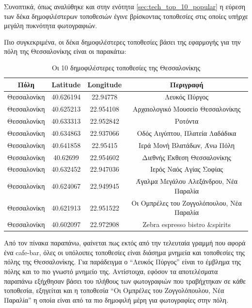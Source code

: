 \documentclass[oneside, 12pt]{book}
\begin{document}
Συνοπτικά, όπως αναλύθηκε και στην ενότητα \ref{sec:tech_top_10_popular} η εύρεση των δέκα δημοφιλέστερων τοποθεσιών έγινε βρίσκοντας τοποθεσίες στις οποίες υπήρχε μεγάλη πυκνότητα φωτογραφιών.

Πιο συγκεκριμένα, οι δέκα δημοφιλέστερες τοποθεσίες βάσει της εφαρμογής για την πόλη της Θεσσαλονίκης είναι οι παρακάτω:
\begin{table}[H]
\centering
    \begin{tabular}{|c|c|c|c|}
        \hline
        Πόλη & Latitude & Longitude & Περιγραφή \\
        \hline
        Θεσσαλονίκη & 40.626194 & 22.94778 & Λευκός Πύργος \\
        Θεσσαλονίκη & 40.625213 & 22.954108 & Αρχαιολογικό Μουσείο Θεσσαλονίκης \\
        Θεσσαλονίκη & 40.633313 & 22.952842 & Ροτόντα \\
        Θεσσαλονίκη & 40.634863 & 22.937066 & Οδός Αιγύπτου, Πλατεία Λαδάδικα \\
        Θεσσαλονίκη & 40.641858 & 22.95415 & Ιερά Μονή Βλατάδων, Άνω Πόλη \\
        Θεσσαλονίκη & 40.62699  & 22.954602 & Διεθνής Έκθεση Θεσσαλονίκης \\
        Θεσσαλονίκη & 40.632452 & 22.947036 & Ιερός Ναός Αγίας Σοφίας \\
        Θεσσαλονίκη & 40.624067 & 22.949945 & Άγαλμα Μεγάλου Αλεξάνδρου, Νέα Παραλία \\
        Θεσσαλονίκη & 40.621913 & 22.951522 & Οι Ομπρέλες του Ζογγολόπουλου, Νέα Παραλία \\
        Θεσσαλονίκη & 40.602097 & 22.972908 & Zebra espresso bistro \&spirits \\
        \hline
    \end{tabular}
    \caption{Οι 10 δημοφιλέστερες τοποθεσίες της Θεσσαλονίκης}
    \label{table:top_10_thessaloniki}
\end{table}

Από τον πίνακα παραπάνω, φαίνεται πως εκτός από την τελευταία 
γραμμή που αφορά ένα cafe-bar, όλες οι υπόλοιπες τοποθεσίες είναι 
διάσημα μνημεία και τοποθεσίες της πόλης της Θεσσαλονίκης.
Για παράδειγμα ο ``Λευκός Πύργος'' είναι το έμβλημα της πόλης και το πιο γνωστό μνημείο της. 
Αντίστοιχα, εφόσον τα αποτελέσματα παραπάνω εξήχθησαν βάσει του πλήθους των φωτογραφιών που τραβήχτηκαν σε κάθε τοποθεσία, εξηγείται και η τοποθεσία ``Οι Ομπρέλες του Ζογγολόπουλου, Νέα Παραλία'' η οποία είναι από τα πιο δημοφιλή μέρη για φωτογραφίες στην πόλη.
\end{document}
